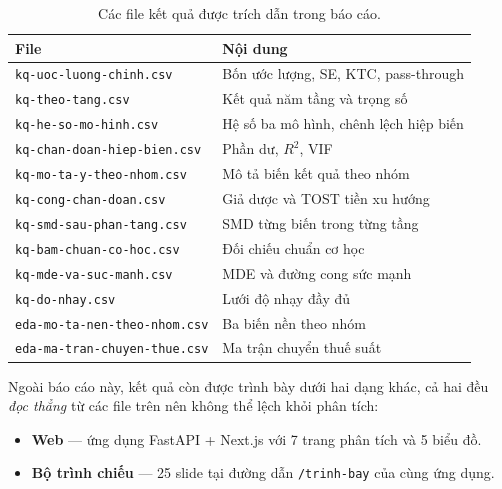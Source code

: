 \documentclass[11pt]{article}
\begin{document}
\begin{table}[htbp]
  \centering
  \caption{Các file kết quả được trích dẫn trong báo cáo.}
  \label{tab:file-ket-qua}
  \begin{tabular}{ll}
    \toprule
    File & Nội dung \\
    \midrule
    \texttt{kq-uoc-luong-chinh.csv}      & Bốn ước lượng, SE, KTC, pass-through \\
    \texttt{kq-theo-tang.csv}            & Kết quả năm tầng và trọng số \\
    \texttt{kq-he-so-mo-hinh.csv}        & Hệ số ba mô hình, chênh lệch hiệp biến \\
    \texttt{kq-chan-doan-hiep-bien.csv}  & Phần dư, $R^2$, VIF \\
    \texttt{kq-mo-ta-y-theo-nhom.csv}    & Mô tả biến kết quả theo nhóm \\
    \texttt{kq-cong-chan-doan.csv}       & Giả dược và TOST tiền xu hướng \\
    \texttt{kq-smd-sau-phan-tang.csv}    & SMD từng biến trong từng tầng \\
    \texttt{kq-bam-chuan-co-hoc.csv}     & Đối chiếu chuẩn cơ học \\
    \texttt{kq-mde-va-suc-manh.csv}      & MDE và đường cong sức mạnh \\
    \texttt{kq-do-nhay.csv}              & Lưới độ nhạy đầy đủ \\
    \texttt{eda-mo-ta-nen-theo-nhom.csv} & Ba biến nền theo nhóm \\
    \texttt{eda-ma-tran-chuyen-thue.csv} & Ma trận chuyển thuế suất \\
    \bottomrule
  \end{tabular}
\end{table}

Ngoài báo cáo này, kết quả còn được trình bày dưới hai dạng khác, cả hai đều \emph{đọc thẳng} từ
các file trên nên không thể lệch khỏi phân tích:

\begin{itemize}
  \item \textbf{Web} --- ứng dụng FastAPI + Next.js với 7 trang phân tích và 5 biểu đồ.
  \item \textbf{Bộ trình chiếu} --- 25 slide tại đường dẫn \texttt{/trinh-bay} của cùng ứng dụng.
\end{itemize}
\end{document}
